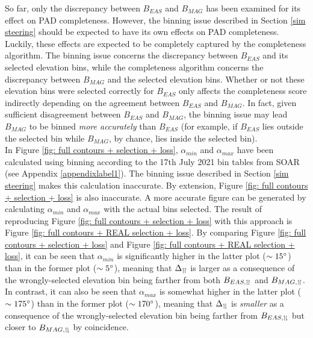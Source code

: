 So far, only the discrepancy between \(B_{EAS}\) and \(B_{MAG}\) has been examined for its effect on PAD completeness. However, the binning issue described in Section \ref{sim steering} should be expected to have its own effects on PAD completeness. Luckily, these effects are expected to be completely captured by the completeness algorithm. The binning issue concerns the discrepancy between \(B_{EAS}\) and its selected elevation bins, while the completeness algorithm concerns the discrepancy between \(B_{MAG}\) and the selected elevation bins. Whether or not these elevation bins were selected correctly for \(B_{EAS}\) only affects the completeness score indirectly depending on the agreement between \(B_{EAS}\) and \(B_{MAG}\). In fact, given sufficient disagreement between \(B_{EAS}\) and \(B_{MAG}\), the binning issue may lead \(B_{MAG}\) to be binned \textit{more accurately} than \(B_{EAS}\) (for example, if \(B_{EAS}\) lies outside the selected bin while \(B_{MAG}\), by chance, lies inside the selected bin).
\\

In Figure \ref{fig: full contours + selection + loss}, \(\alpha_{min}\) and \(\alpha_{max}\) have been calculated using binning according to the 17th July 2021 bin tables from SOAR (see Appendix \ref{appendixlabel1}). The binning issue described in Section \ref{sim steering} makes this calculation inaccurate. By extension, Figure \ref{fig: full contours + selection + loss} is also inaccurate. A more accurate figure can be generated by calculating \(\alpha_{min}\) and \(\alpha_{max}\) with the actual bins selected. The result of reproducing Figure \ref{fig: full contours + selection + loss} with this  approach is Figure \ref{fig: full contours + REAL selection + loss}. By comparing Figure \ref{fig: full contours + selection + loss} and Figure \ref{fig: full contours + REAL selection + loss}, it can be seen that \(\alpha_{min}\) is significantly higher in the latter plot (\(\sim15\degree\)) than in the former plot (\(\sim5\degree\)), meaning that \(\Delta_{\upharpoonleft \! \upharpoonright}\) is larger as a consequence of the wrongly-selected elevation bin being farther from both \(B_{EAS, \upharpoonleft \! \upharpoonright}\) and \(B_{MAG, \upharpoonleft \! \upharpoonright}\). In contrast, it can also be seen that \(\alpha_{max}\) is somewhat higher in the latter plot (\(\sim175\degree\)) than in the former plot (\(\sim170\degree\)), meaning that \(\Delta_{\upharpoonleft \! \downharpoonright}\) is \textit{smaller} as a consequence of the wrongly-selected elevation bin being farther from \(B_{EAS, \upharpoonleft \! \downharpoonright}\) but closer to \(B_{MAG, \upharpoonleft \! \downharpoonright}\) by coincidence.
\\

